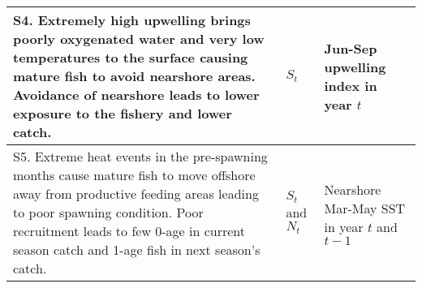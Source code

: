 \begin{table}[t]
\begin{tabular}{>{\raggedright\arraybackslash}p{10.5cm}|>{\raggedright\arraybackslash}p{1cm}|>{\raggedright\arraybackslash}p{3cm}}
\hline
S4.  Extremely high upwelling brings poorly oxygenated water and very low temperatures to the surface causing mature fish to avoid nearshore areas. Avoidance of nearshore leads to lower exposure to the fishery and lower catch. & $S_t$ & Jun-Sep upwelling index in year $t$\\
\hline
S5.  Extreme heat events in the pre-spawning months cause mature fish to move offshore away from productive feeding areas leading to poor spawning condition. Poor recruitment leads to few 0-age in current season catch and 1-age fish in next season's catch. & $S_t$ and $N_t$ & Nearshore Mar-May SST in year $t$ and $t-1$\\
\hline
\end{tabular}
\end{table}

\clearpage

